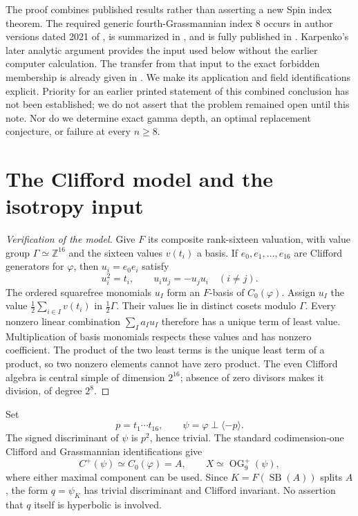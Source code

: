 \documentclass[11pt]{article}
\newcommand{\OG}{\operatorname{OG}}
\newcommand{\SB}{\operatorname{SB}}
\newcommand{\Z}{\mathbb Z}
\begin{document}
The proof combines published results rather than asserting a new Spin
index theorem. The required generic fourth-Grassmannian index $8$ occurs
in author versions dated 2021 of \cite{oddspin}, is summarized in
\cite{indexes}, and is fully published in \cite{oddspin}. Karpenko's
later analytic argument \cite[Theorem 4.1 and Corollary 4.4]{isotropy}
provides the input used below without the earlier computer calculation.
The transfer from that input to the exact forbidden membership is already
given in \cite[following Conjecture 4.7]{around}. We make its application
and field identifications explicit. Priority for an earlier printed
statement of this combined conclusion has not been established; we do
not assert that the problem remained open until this note. Nor do we
determine exact gamma depth, an optimal replacement conjecture, or failure
at every $n\geq8$.

\section{The Clifford model and the isotropy input}

\begin{proof}[Verification of the model]
Give $F$ its composite rank-sixteen valuation, with value group
$\Gamma\simeq\Z^{16}$ and the sixteen values $v(t_i)$ a basis. If
$e_0,e_1,\ldots,e_{16}$ are Clifford generators for $\varphi$, then
$u_i=e_0e_i$ satisfy
\[
                  u_i^2=t_i,\qquad u_iu_j=-u_ju_i\quad(i\ne j).
\]
The ordered squarefree monomials $u_I$ form an $F$-basis of
$C_0(\varphi)$. Assign $u_I$ the value
$\frac12\sum_{i\in I}v(t_i)$ in $\frac12\Gamma$. Their values lie in
distinct cosets modulo $\Gamma$. Every nonzero linear combination
$\sum_I a_Iu_I$ therefore has a unique term of least value.
Multiplication of basis monomials respects these values and has nonzero
coefficient. The product of the two least terms is the unique least term
of a product, so two nonzero elements cannot have zero product.
The even Clifford algebra is central simple of dimension $2^{16}$;
absence of zero divisors makes it division, of degree $2^8$.
\end{proof}

Set
\[
 p=t_1\cdots t_{16},\qquad
 \psi=\varphi\perp\langle-p\rangle.
\]
The signed discriminant of $\psi$ is $p^2$, hence trivial. The standard
codimension-one Clifford and Grassmannian identifications
\cite[\S1]{around} give
\[
 C^+(\psi)\simeq C_0(\varphi)=A,
 \qquad X\simeq\OG^+_9(\psi),
\]
where either maximal component can be used. Since $K=F(\SB(A))$
splits $A$, the form $q=\psi_K$ has trivial discriminant and Clifford
invariant. No assertion that $q$ itself is hyperbolic is involved.
\end{document}
